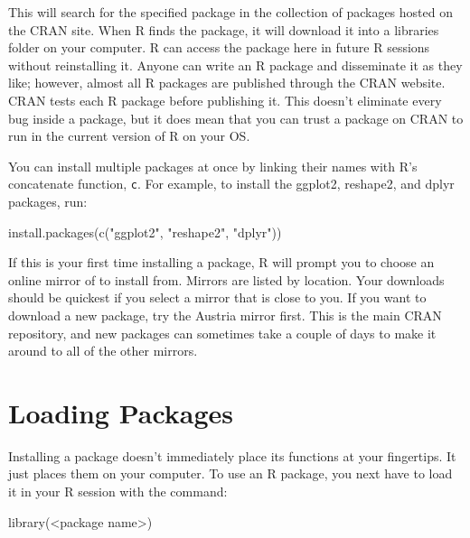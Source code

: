\documentclass[
  letterpaper,
  DIV=11,
  numbers=noendperiod]{scrbook}
\newenvironment{Shaded}{\begin{snugshade}}{\end{snugshade}}
\newcommand{\FunctionTok}[1]{\textcolor[rgb]{0.28,0.35,0.67}{#1}}
\newcommand{\NormalTok}[1]{\textcolor[rgb]{0.00,0.23,0.31}{#1}}
\newcommand{\SpecialCharTok}[1]{\textcolor[rgb]{0.37,0.37,0.37}{#1}}
\newcommand{\StringTok}[1]{\textcolor[rgb]{0.13,0.47,0.30}{#1}}
\begin{document}
This will search for the specified package in the collection of packages
hosted on the CRAN site. When R finds the package, it will download it
into a libraries folder on your computer. R can access the package here
in future R sessions without reinstalling it. Anyone can write an R
package and disseminate it as they like; however, almost all R packages
are published through the CRAN website. CRAN tests each R package before
publishing it. This doesn't eliminate every bug inside a package, but it
does mean that you can trust a package on CRAN to run in the current
version of R on your OS.

You can install multiple packages at once by linking their names with
R's concatenate function, \texttt{c}. For example, to install the
ggplot2, reshape2, and dplyr packages, run:

\begin{Shaded}
\begin{Highlighting}[]
\FunctionTok{install.packages}\NormalTok{(}\FunctionTok{c}\NormalTok{(}\StringTok{"ggplot2"}\NormalTok{, }\StringTok{"reshape2"}\NormalTok{, }\StringTok{"dplyr"}\NormalTok{))}
\end{Highlighting}
\end{Shaded}

If this is your first time installing a package, R will prompt you to
choose an online mirror of to install from. Mirrors are listed by
location. Your downloads should be quickest if you select a mirror that
is close to you. If you want to download a new package, try the Austria
mirror first. This is the main CRAN repository, and new packages can
sometimes take a couple of days to make it around to all of the other
mirrors.

\section{Loading Packages}\label{loading-packages}

Installing a package doesn't immediately place its functions at your
fingertips. It just places them on your computer. To use an R package,
you next have to load it in your R session with the command:

\begin{Shaded}
\begin{Highlighting}[]
\FunctionTok{library}\NormalTok{(}\SpecialCharTok{\textless{}}\NormalTok{package name}\SpecialCharTok{\textgreater{}}\NormalTok{)}
\end{Highlighting}
\end{Shaded}
\end{document}
